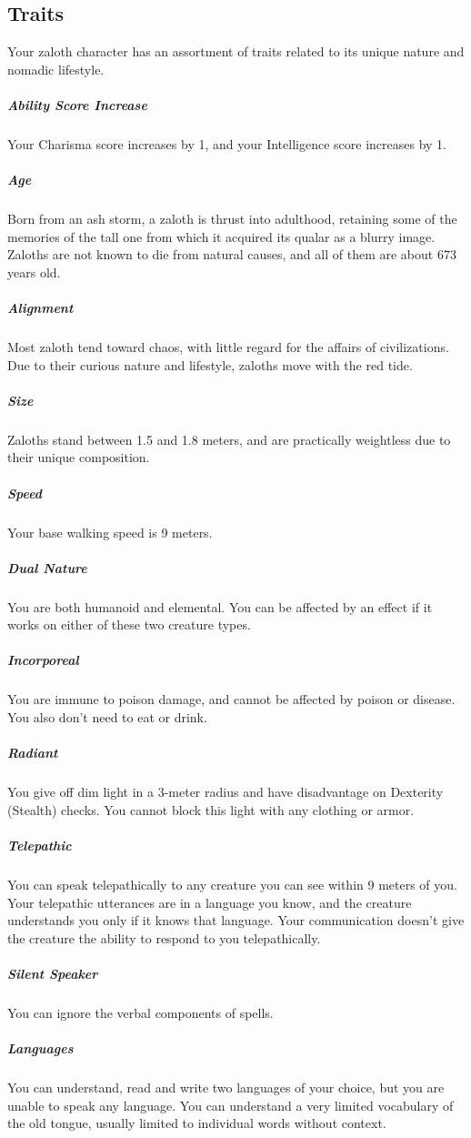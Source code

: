 \begin{linenumbers}
\subsection*{Traits}
Your zaloth character has an assortment of traits related to its unique nature and nomadic lifestyle.
\subparagraph{Ability Score Increase} Your Charisma score increases by 1, and your Intelligence score increases by 1.
\subparagraph{Age} Born from an ash storm, a zaloth is thrust into adulthood, retaining some of the memories of the tall one from which it acquired its qualar as a blurry image.
Zaloths are not known to die from natural causes, and all of them are about 673 years old.
\subparagraph{Alignment} Most zaloth tend toward chaos, with little regard for the affairs of civilizations.
Due to their curious nature and lifestyle, zaloths move with the red tide.
\subparagraph{Size} Zaloths stand between 1.5 and 1.8 meters, and are practically weightless due to their unique composition.
\subparagraph{Speed} Your base walking speed is 9 meters.
\subparagraph{Dual Nature} You are both humanoid and elemental.
You can be affected by an effect if it works on either of these two creature types.
\subparagraph{Incorporeal} You are immune to poison damage, and cannot be affected by poison or disease.
You also don't need to eat or drink.
\subparagraph{Radiant} You give off dim light in a 3-meter radius and have disadvantage on Dexterity (Stealth) checks.
You cannot block this light with any clothing or armor.
\subparagraph{Telepathic} You can speak telepathically to any creature you can see within 9 meters of you.
Your telepathic utterances are in a language you know, and the creature understands you only if it knows that language.
Your communication doesn't give the creature the ability to respond to you telepathically.
\subparagraph{Silent Speaker} You can ignore the verbal components of spells.
\subparagraph{Languages} You can understand, read and write two languages of your choice, but you are unable to speak any language.
You can understand a very limited vocabulary of the old tongue, usually limited to individual words without context.


\end{linenumbers}
